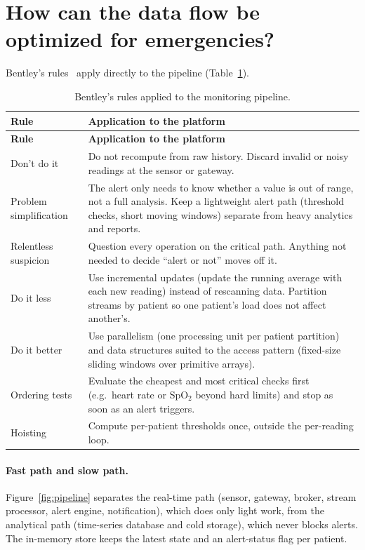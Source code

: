 \documentclass[11pt,a4paper]{article}
\begin{document}
\section{How can the data flow be optimized for emergencies?}

Bentley's rules~\cite{bentley1982,bentley1986} apply directly to the pipeline (Table~\ref{tab:bentley}).

\begin{longtable}{@{}>{\raggedright\arraybackslash}p{3.3cm}>{\raggedright\arraybackslash}p{12.2cm}@{}}
\caption{Bentley's rules applied to the monitoring pipeline.}\label{tab:bentley}\\
\toprule
\textbf{Rule} & \textbf{Application to the platform}\\
\midrule
\endfirsthead
\toprule
\textbf{Rule} & \textbf{Application to the platform}\\
\midrule
\endhead
\bottomrule
\endfoot
Don't do it & Do not recompute from raw history. Discard invalid or noisy readings at the sensor or gateway.\\
Problem simplification & The alert only needs to know whether a value is out of range, not a full analysis. Keep a lightweight alert path (threshold checks, short moving windows) separate from heavy analytics and reports.\\
Relentless suspicion & Question every operation on the critical path. Anything not needed to decide ``alert or not'' moves off it.\\
Do it less & Use incremental updates (update the running average with each new reading) instead of rescanning data. Partition streams by patient so one patient's load does not affect another's.\\
Do it better & Use parallelism (one processing unit per patient partition) and data structures suited to the access pattern (fixed-size sliding windows over primitive arrays).\\
Ordering tests & Evaluate the cheapest and most critical checks first (e.g.\ heart rate or SpO$_2$ beyond hard limits) and stop as soon as an alert triggers.\\
Hoisting & Compute per-patient thresholds once, outside the per-reading loop.\\
\end{longtable}

\paragraph{Fast path and slow path.} Figure~\ref{fig:pipeline} separates the real-time path (sensor, gateway, broker, stream processor, alert engine, notification), which does only light work, from the analytical path (time-series database and cold storage), which never blocks alerts. The in-memory store keeps the latest state and an alert-status flag per patient.
\end{document}
